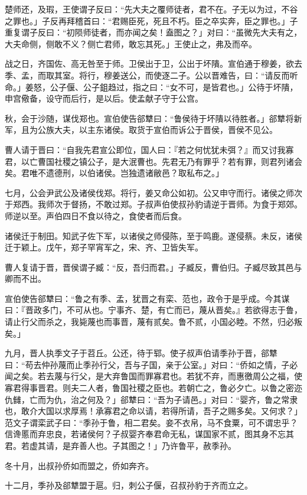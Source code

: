 \documentclass[]{article}
\begin{document}
楚师还，及瑕，王使谓子反曰：``先大夫之覆师徒者，君不在。子无以为过，不谷之罪也。」子反再拜稽首曰：``君赐臣死，死且不朽。臣之卒实奔，臣之罪也。」子重复谓子反曰：``初陨师徒者，而亦闻之矣！盍图之？」对曰：``虽微先大夫有之，大夫命侧，侧敢不义？侧亡君师，敢忘其死。」王使止之，弗及而卒。

战之日，齐国佐、高无咎至于师。卫侯出于卫，公出于坏隤。宣伯通于穆姜，欲去季、孟，而取其室。将行，穆姜送公，而使逐二子。公以晋难告，曰：``请反而听命。」姜怒，公子偃、公子鉏趋过，指之曰：``女不可，是皆君也。」公待于坏隤，申宫儆备，设守而后行，是以后。使孟献子守于公宫。

秋，会于沙随，谋伐郑也。宣伯使告郤犨曰：``鲁侯待于坏隤以待胜者。」郤犨将新军，且为公族大夫，以主东诸侯。取货于宣伯而诉公于晋侯，晋侯不见公。

曹人请于晋曰：``自我先君宣公即位，国人曰：『若之何忧犹未弭？』而又讨我寡君，以亡曹国社稷之镇公子，是大泯曹也。先君无乃有罪乎？若有罪，则君列诸会矣。君唯不遗德刑，以伯诸侯。岂独遗诸敝邑？取私布之。」

七月，公会尹武公及诸侯伐郑。将行，姜又命公如初。公又申守而行。诸侯之师次于郑西。我师次于督扬，不敢过郑。子叔声伯使叔孙豹请逆于晋师。为食于郑郊。师逆以至。声伯四日不食以待之，食使者而后食。

诸侯迁于制田。知武子佐下军，以诸侯之师侵陈，至于鸣鹿。遂侵蔡。未反，诸侯迁于颖上。戊午，郑子罕宵军之，宋、齐、卫皆失军。

曹人复请于晋，晋侯谓子臧：``反，吾归而君。」子臧反，曹伯归。子臧尽致其邑与卿而不出。

宣伯使告郤犨曰：``鲁之有季、孟，犹晋之有栾、范也，政令于是乎成。今其谋曰：『晋政多门，不可从也。宁事齐、楚，有亡而已，蔑从晋矣。』若欲得志于鲁，请止行父而杀之，我毙蔑也而事晋，蔑有贰矣。鲁不贰，小国必睦。不然，归必叛矣。」

九月，晋人执季文子于苕丘。公还，待于郓。使子叔声伯请季孙于晋，郤犨曰：``苟去仲孙蔑而止季孙行父，吾与子国，亲于公室。」对曰：``侨如之情，子必闻之矣。若去蔑与行父，是大弃鲁国而罪寡君也。若犹不弃，而惠徼周公之福，使寡君得事晋君。则夫二人者，鲁国社稷之臣也。若朝亡之，鲁必夕亡。以鲁之密迩仇雠，亡而为仇，治之何及？」郤犨曰：``吾为子请邑。」对曰：``婴齐，鲁之常隶也，敢介大国以求厚焉！承寡君之命以请，若得所请，吾子之赐多矣。又何求？」范文子谓栾武子曰：``季孙于鲁，相二君矣。妾不衣帛，马不食粟，可不谓忠乎？信谗慝而弃忠良，若诸侯何？子叔婴齐奉君命无私，谋国家不贰，图其身不忘其君。若虚其请，是弃善人也。子其图之！」乃许鲁平，赦季孙。

冬十月，出叔孙侨如而盟之，侨如奔齐。

十二月，季孙及郤犨盟于扈。归，刺公子偃，召叔孙豹于齐而立之。
\end{document}

